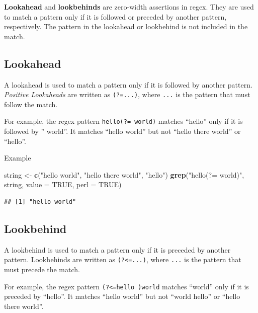 \documentclass[
]{book}
\newenvironment{Shaded}{\begin{snugshade}}{\end{snugshade}}
\newcommand{\AttributeTok}[1]{\textcolor[rgb]{0.13,0.29,0.53}{#1}}
\newcommand{\ConstantTok}[1]{\textcolor[rgb]{0.56,0.35,0.01}{#1}}
\newcommand{\FunctionTok}[1]{\textcolor[rgb]{0.13,0.29,0.53}{\textbf{#1}}}
\newcommand{\NormalTok}[1]{#1}
\newcommand{\OtherTok}[1]{\textcolor[rgb]{0.56,0.35,0.01}{#1}}
\newcommand{\StringTok}[1]{\textcolor[rgb]{0.31,0.60,0.02}{#1}}
\begin{document}
\textbf{Lookahead} and \textbf{lookbehinds} are zero-width assertions in regex. They are used to match a pattern only if it is followed or preceded by another pattern, respectively. The pattern in the lookahead or lookbehind is not included in the match.

\hypertarget{lookahead}{%
\subsection{Lookahead}\label{lookahead}}

A lookahead is used to match a pattern only if it is followed by another pattern. \emph{Positive Lookaheads} are written as \texttt{(?=...)}, where \texttt{...} is the pattern that must follow the match.

For example, the regex pattern \texttt{hello(?=\ world)} matches ``hello'' only if it is followed by '' world''. It matches ``hello world'' but not ``hello there world'' or ``hello''.

Example

\begin{Shaded}
\begin{Highlighting}[]
\NormalTok{string }\OtherTok{\textless{}{-}} \FunctionTok{c}\NormalTok{(}\StringTok{"hello world"}\NormalTok{, }\StringTok{"hello there world"}\NormalTok{, }\StringTok{"hello"}\NormalTok{)}
\FunctionTok{grep}\NormalTok{(}\StringTok{"hello(?= world)"}\NormalTok{, string, }\AttributeTok{value =} \ConstantTok{TRUE}\NormalTok{, }\AttributeTok{perl =} \ConstantTok{TRUE}\NormalTok{)}
\end{Highlighting}
\end{Shaded}

\begin{verbatim}
## [1] "hello world"
\end{verbatim}

\hypertarget{lookbehind}{%
\subsection{Lookbehind}\label{lookbehind}}

A lookbehind is used to match a pattern only if it is preceded by another pattern. Lookbehinds are written as \texttt{(?\textless{}=...)}, where \texttt{...} is the pattern that must precede the match.

For example, the regex pattern \texttt{(?\textless{}=hello\ )world} matches ``world'' only if it is preceded by ``hello''. It matches ``hello world'' but not ``world hello'' or ``hello there world''.
\end{document}
